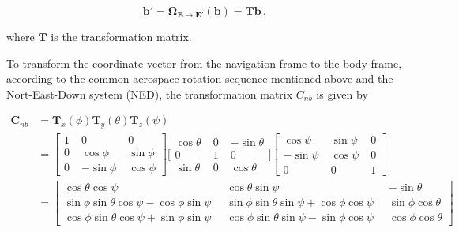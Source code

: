 \begin{equation}\label{eq:transformation}
  \mathbf{b'} = \bm{\Omega}_{\mathbf{E} \rightarrow \mathbf{E}'}(\mathbf{b}) = \mathbf{T} \mathbf{b}\,,
\end{equation}

\noindent
where $\mathbf{T}$ is the transformation matrix.

To transform the coordinate vector from the navigation frame to the body frame, according to the common aerospace rotation sequence mentioned above and the Nort-East-Down system (NED), the transformation matrix $C_{nb}$ is given by

\begin{equation}
\begin{split}
\mathbf{C}_{nb} & = \mathbf{T}_x(\phi) \mathbf{T}_y(\theta) \mathbf{T}_z(\psi) \\
 & = {\left[ \begin{smallmatrix}
    1 \; & 0 \; & 0 \\
    0 \; & \cos \phi \; & \sin \phi \\
    0 \; & -\sin \phi \; & \cos \phi
    \end{smallmatrix}\right]}
    {\bigg[ \begin{smallmatrix}
    \cos \theta \; & 0 \; & -\sin \theta \\
    0 \; & 1 \; & 0 \\
    \sin \theta \; & 0 \; & \cos \theta
    \end{smallmatrix} \bigg]}
    {\left[\begin{smallmatrix}
    \cos \psi \; & \sin \psi \; & 0 \\
    -\sin \psi \; & \cos \psi \; & 0 \\
    0 \; & 0 \; & 1
    \end{smallmatrix}\right]}\\
 & = {\left[\begin{smallmatrix}
   \cos \theta \cos \psi \; &
    \cos \theta \sin \psi \; &
   -\sin \theta \\
    \sin \phi \sin \theta \cos \psi - \cos \phi \sin \psi \;\; &
    \sin \phi \sin \theta \sin \psi + \cos \phi \cos \psi \;\; &
    \sin \phi \cos \theta \\
    \cos \phi \sin \theta \cos \psi + \sin \phi \sin \psi \;\; &
    \cos \phi \sin \theta \sin \psi - \sin \phi \cos \psi \;\; &
    \cos \phi \cos \theta
  \end{smallmatrix}\right]}
\end{split}
\end{equation}

